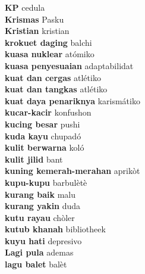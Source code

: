 \textbf{ KP  } cedula \\
\textbf{ Krismas  } Pasku \\
\textbf{ Kristian  } kristian \\
\textbf{ krokuet daging  } balchi \\
\textbf{ kuasa nuklear  } atómiko \\
\textbf{ kuasa penyesuaian  } adaptabilidat \\
\textbf{ kuat dan cergas  } atlétiko \\
\textbf{ kuat dan tangkas  } atlétiko \\
\textbf{ kuat daya penariknya  } karismátiko \\
\textbf{ kucar-kacir  } konfushon \\
\textbf{ kucing besar  } pushi \\
\textbf{ kuda kayu  } chupadó \\
\textbf{ kulit berwarna  } koló \\
\textbf{ kulit jilid  } bant \\
\textbf{ kuning kemerah-merahan  } aprikòt \\
\textbf{ kupu-kupu  } barbulètè \\
\textbf{ kurang baik  } malu \\
\textbf{ kurang yakin  } duda \\
\textbf{ kutu rayau  } chòler \\
\textbf{ kutub khanah  } bibliotheek \\
\textbf{ kuyu hati  } depresivo \\
\textbf{ Lagi pula  } ademas \\
\textbf{ lagu balet  } balèt \\
